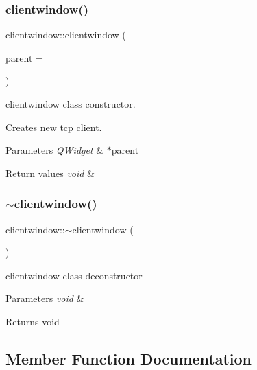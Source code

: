\subsubsection{\texorpdfstring{clientwindow()}{clientwindow()}}
{\footnotesize\ttfamily clientwindow\+::clientwindow (\begin{DoxyParamCaption}\item[{Q\+Widget $\ast$}]{parent = {} }\end{DoxyParamCaption})\hspace{0.3cm}{\ttfamily [explicit]}}



clientwindow class constructor. 

Creates new tcp client. 
\begin{DoxyParams}{Parameters}
{\em Q\+Widget} & $\ast$parent \\
\hline
\end{DoxyParams}

\begin{DoxyRetVals}{Return values}
{\em void} & \\
\hline
\end{DoxyRetVals}
\mbox{\label{classclientwindow_a53333bf0d133c70836f94ba20242fd36}} 
\subsubsection{\texorpdfstring{$\sim$clientwindow()}{~clientwindow()}}
{\footnotesize\ttfamily clientwindow\+::$\sim$clientwindow (\begin{DoxyParamCaption}{ }\end{DoxyParamCaption})}



clientwindow class deconstructor 


\begin{DoxyParams}{Parameters}
{\em void} & \\
\hline
\end{DoxyParams}
\begin{DoxyReturn}{Returns}
void 
\end{DoxyReturn}


\subsection{Member Function Documentation}
\mbox{\label{classclientwindow_aef46aaa18fbaff0c95db9ae6c24a8847}} 
